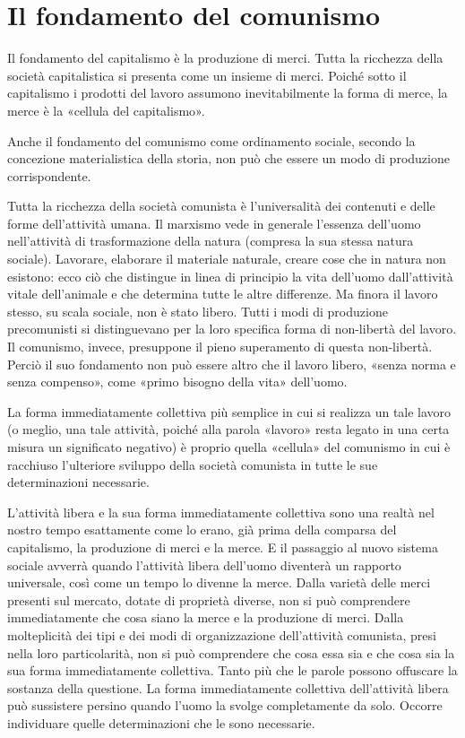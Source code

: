 \documentclass[../main]{subfiles}
\begin{document}
\ifSubfilesClassLoaded{\setcounter{page}{14}}{}
\section{Il fondamento del comunismo}
\label{sec:03_fondamenti}

Il fondamento del capitalismo è la produzione di merci. Tutta la ricchezza della società capitalistica si presenta come un insieme di merci. Poiché sotto il capitalismo i prodotti del lavoro assumono inevitabilmente la forma di merce, la merce è la «cellula del capitalismo».

Anche il fondamento del comunismo come ordinamento sociale, secondo la concezione materialistica della storia, non può che essere un modo di produzione corrispondente.

Tutta la ricchezza della società comunista è l'universalità dei contenuti e delle forme dell'attività umana. Il marxismo vede in generale l'essenza dell'uomo nell'attività di trasformazione della natura (compresa la sua stessa natura sociale). Lavorare, elaborare il materiale naturale, creare cose che in natura non esistono: ecco ciò che distingue in linea di principio la vita dell'uomo dall'attività vitale dell'animale e che determina tutte le altre differenze. Ma finora il lavoro stesso, su scala sociale, non è stato libero. Tutti i modi di produzione precomunisti si distinguevano per la loro specifica forma di non-libertà del lavoro. Il comunismo, invece, presuppone il pieno superamento di questa non-libertà. Perciò il suo fondamento non può essere altro che il lavoro libero, «senza norma e senza compenso», come «primo bisogno della vita» dell'uomo.

La forma immediatamente collettiva più semplice in cui si realizza un tale lavoro (o meglio, una tale attività, poiché alla parola «lavoro» resta legato in una certa misura un significato negativo) è proprio quella «cellula» del comunismo in cui è racchiuso l'ulteriore sviluppo della società comunista in tutte le sue determinazioni necessarie.

L'attività libera e la sua forma immediatamente collettiva sono una realtà nel nostro tempo esattamente come lo erano, già prima della comparsa del capitalismo, la produzione di merci e la merce. E il passaggio al nuovo sistema sociale avverrà quando l'attività libera dell'uomo diventerà un rapporto universale, così come un tempo lo divenne la merce. Dalla varietà delle merci presenti sul mercato, dotate di proprietà diverse, non si può comprendere immediatamente che cosa siano la merce e la produzione di merci. Dalla molteplicità dei tipi e dei modi di organizzazione dell'attività comunista, presi nella loro particolarità, non si può comprendere che cosa essa sia e che cosa sia la sua forma immediatamente collettiva. Tanto più che le parole possono offuscare la sostanza della questione. La forma immediatamente collettiva dell'attività libera può sussistere persino quando l'uomo la svolge completamente da solo. Occorre individuare quelle determinazioni che le sono necessarie.
\end{document}
